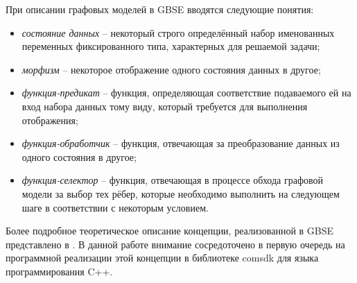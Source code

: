 При описании графовых моделей в GBSE вводятся следующие понятия:
\begin{itemize}
    \item \textit{состояние данных} -- некоторый строго определённый набор именованных переменных фиксированного типа, характерных для решаемой задачи;
    \item \textit{морфизм} -- некоторое отображение одного состояния данных в другое;
    \item \textit{функция-предикат} -- функция, определяющая соответствие подаваемого ей на вход набора данных тому виду, который требуется для выполнения отображения;
    \item \textit{функция-обработчик} -- функция, отвечающая за преобразование данных из одного состояния в другое;
    \item \textit{функция-селектор} -- функция, отвечающая в процессе обхода графовой модели за выбор тех рёбер, которые необходимо выполнить на следующем шаге в соответствии с некоторым условием.
\end{itemize}

Более подробное теоретическое описание концепции, реализованной в GBSE представлено в \cite{SokolovPershin2018}. В данной работе внимание сосредоточено в первую очередь на программной реализации этой концепции в библиотеке comsdk для языка программирования C++.
